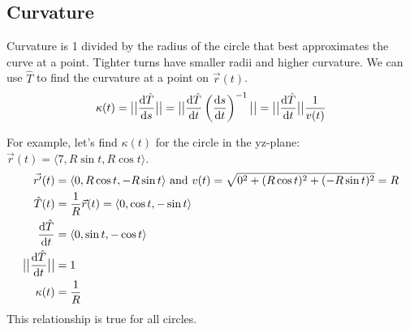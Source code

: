 \subsection{Curvature}
Curvature is 1 divided by the radius of the circle that best approximates the curve at a point.
Tighter turns have smaller radii and higher curvature.
We can use $\hat{T}$ to find the curvature at a point on $\vec{r}(t)$.
\begin{equation*}
	\kappa(t) = \big\lvert \big\lvert \frac{\mathrm{d} \hat{T}}{\mathrm{d} s} \big\rvert \big\rvert = \big\lvert \big\lvert \frac{\mathrm{d} \hat{T}}{\mathrm{d} t}\left(\frac{\mathrm{d} s}{\mathrm{d} t}\right)^{-1} \big\rvert \big\rvert = \big\lvert \big\lvert \frac{\mathrm{d} \hat{T}}{\mathrm{d} t} \big\rvert \big\rvert\frac{1}{v(t)}
\end{equation*}

\noindent
For example, let's find $\kappa(t)$ for the circle in the yz-plane: $\vec{r}(t)=\langle 7, R\sin{t}, R\cos{t} \rangle$.
\begin{align*}
	\vec{r^\prime}(t) &= \langle 0, R\cos{t}, -R\sin{t}\rangle
	\text{ and }
	v(t) = \sqrt{0^2+(R\cos{t})^2+(-R\sin{t})^2} = R \\
	\hat{T}(t) &= \frac{1}{R}\vec{r}(t) = \langle0,\cos{t},-\sin{t}\rangle \\
	\frac{\mathrm{d}\hat{T}}{\mathrm{d}t} &= \langle 0,\sin{t},-\cos{t}\rangle \\
	\big\lvert \big\lvert \frac{\mathrm{d}\hat{T}}{\mathrm{d}t} \big\rvert \big\rvert &= 1 \\
	\kappa(t) &= \frac{1}{R}
\end{align*}
This relationship is true for all circles.